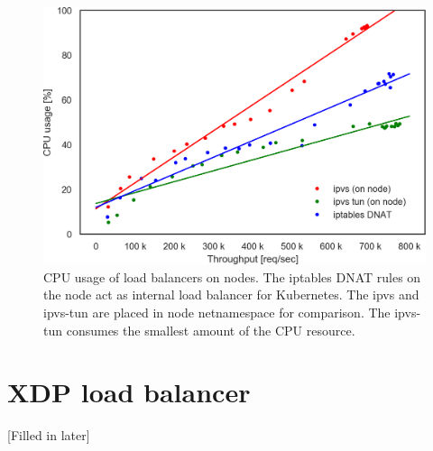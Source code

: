 \begin{figure}[h]
  \centering
  \includegraphics[width=0.8\columnwidth]{Figs/cpu_usage_10g_node_ns}
  \par\bigskip
  \centering
  \begin{minipage}{0.9\columnwidth}
    \caption[CPU usage of load balancers on nodes]{
      CPU usage of load balancers on nodes.
      The iptables DNAT rules on the node act as internal load balancer for Kubernetes.
      The ipvs and ipvs-tun are placed in node netnamespace for comparison. 
      The ipvs-tun consumes the smallest amount of the CPU resource.
    }
    \label{fig:cpu_usage_10g_node_ns}
  \end{minipage}
\end{figure}


\FloatBarrier
\section{XDP load balancer}

[Filled in later]

